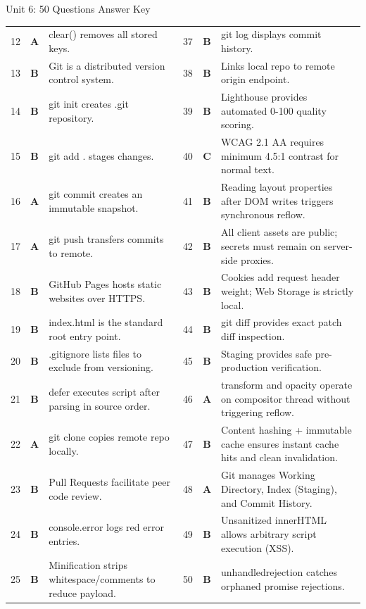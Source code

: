 \begin{answerkeytable}{Unit 6: 50 Questions Answer Key}
\begin{tabularx}{\textwidth}{l c X l c X}
12 & \textbf{A} & clear() removes all stored keys. & 37 & \textbf{B} & git log displays commit history. \\
13 & \textbf{B} & Git is a distributed version control system. & 38 & \textbf{B} & Links local repo to remote origin endpoint. \\
14 & \textbf{B} & git init creates .git repository. & 39 & \textbf{B} & Lighthouse provides automated 0-100 quality scoring. \\
15 & \textbf{B} & git add . stages changes. & 40 & \textbf{C} & WCAG 2.1 AA requires minimum 4.5:1 contrast for normal text. \\
16 & \textbf{A} & git commit creates an immutable snapshot. & 41 & \textbf{B} & Reading layout properties after DOM writes triggers synchronous reflow. \\
17 & \textbf{A} & git push transfers commits to remote. & 42 & \textbf{B} & All client assets are public; secrets must remain on server-side proxies. \\
18 & \textbf{B} & GitHub Pages hosts static websites over HTTPS. & 43 & \textbf{B} & Cookies add request header weight; Web Storage is strictly local. \\
19 & \textbf{B} & index.html is the standard root entry point. & 44 & \textbf{B} & git diff provides exact patch diff inspection. \\
20 & \textbf{B} & .gitignore lists files to exclude from versioning. & 45 & \textbf{B} & Staging provides safe pre-production verification. \\
21 & \textbf{B} & defer executes script after parsing in source order. & 46 & \textbf{A} & transform and opacity operate on compositor thread without triggering reflow. \\
22 & \textbf{A} & git clone copies remote repo locally. & 47 & \textbf{B} & Content hashing + immutable cache ensures instant cache hits and clean invalidation. \\
23 & \textbf{B} & Pull Requests facilitate peer code review. & 48 & \textbf{A} & Git manages Working Directory, Index (Staging), and Commit History. \\
24 & \textbf{B} & console.error logs red error entries. & 49 & \textbf{B} & Unsanitized innerHTML allows arbitrary script execution (XSS). \\
25 & \textbf{B} & Minification strips whitespace/comments to reduce payload. & 50 & \textbf{B} & unhandledrejection catches orphaned promise rejections. \\
\bottomrule
\end{tabularx}
\end{answerkeytable}

